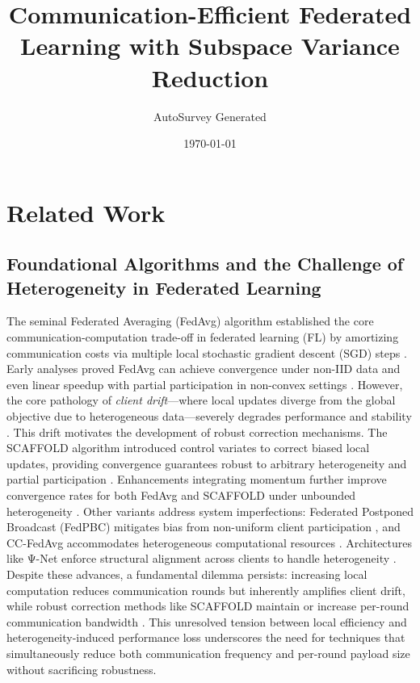 \documentclass[11pt]{article}
\title{Communication-Efficient Federated Learning with Subspace Variance Reduction}
\author{AutoSurvey Generated}
\date{\today}
\begin{document}
\maketitle

\section{Related Work}

\subsection{Foundational Algorithms and the Challenge of Heterogeneity in Federated Learning}
The seminal Federated Averaging (FedAvg) algorithm established the core communication-computation trade-off in federated learning (FL) by amortizing communication costs via multiple local stochastic gradient descent (SGD) steps \citep{konevcny2016federated}. Early analyses proved FedAvg can achieve convergence under non-IID data \citep{li2019convergence} and even linear speedup with partial participation in non-convex settings \citep{Yang2021AchievingLS}. However, the core pathology of \textit{client drift}—where local updates diverge from the global objective due to heterogeneous data—severely degrades performance and stability \citep{li2019convergence, su2023non}. This drift motivates the development of robust correction mechanisms. The SCAFFOLD algorithm introduced control variates to correct biased local updates, providing convergence guarantees robust to arbitrary heterogeneity and partial participation \citep{karimireddy2020scaffold}. Enhancements integrating momentum further improve convergence rates for both FedAvg and SCAFFOLD under unbounded heterogeneity \citep{Cheng2023MomentumBN}. Other variants address system imperfections: Federated Postponed Broadcast (FedPBC) mitigates bias from non-uniform client participation \citep{xiang2023towards}, and CC-FedAvg accommodates heterogeneous computational resources \citep{Zhang2022CCFedAvgCC}. Architectures like Ψ-Net enforce structural alignment across clients to handle heterogeneity \citep{Yu2020HeterogeneousFL}. Despite these advances, a fundamental dilemma persists: increasing local computation reduces communication rounds but inherently amplifies client drift, while robust correction methods like SCAFFOLD maintain or increase per-round communication bandwidth \citep{karimireddy2020scaffold}. This unresolved tension between local efficiency and heterogeneity-induced performance loss underscores the need for techniques that simultaneously reduce both communication frequency and per-round payload size without sacrificing robustness.
\end{document}
